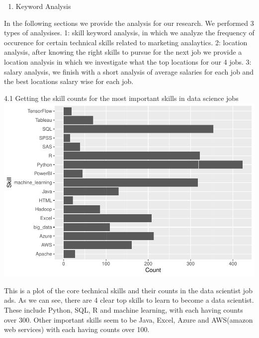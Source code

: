 \documentclass[
]{article}
\providecommand{\tightlist}{%
  \setlength{\itemsep}{0pt}\setlength{\parskip}{0pt}}
\begin{document}
\begin{enumerate}
\def\labelenumi{\arabic{enumi}.}
\setcounter{enumi}{3}
\tightlist
\item
  Keyword Analysis
\end{enumerate}

In the following sections we provide the analysis for our research. We
performed 3 types of analysises. 1: skill keyword analysis, in which we
analyze the frequency of occurence for certain technical skills related
to marketing analaytics. 2: location analysis, after knowing the right
skills to pursue for the next job we provide a location analysis in
which we investigate what the top locations for our 4 jobs. 3: salary
analysis, we finish with a short analysis of average salaries for each
job and the best locations salary wise for each job.

4.1 Getting the skill counts for the most important skills in data
science jobs
\includegraphics{analysis_files/figure-latex/unnamed-chunk-13-1.pdf}

This is a plot of the core technical skills and their counts in the data
scientist job ads. As we can see, there are 4 clear top skills to learn
to become a data scientist. These include Python, SQL, R and machine
learning, with each having counts over 300. Other important skills seem
to be Java, Excel, Azure and AWS(amazon web services) with each having
counts over 100.
\end{document}
